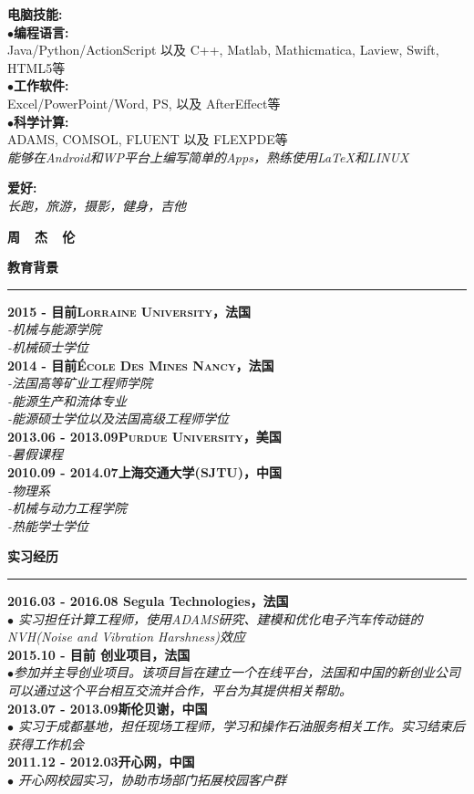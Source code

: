 \documentclass[a4paper,12pt,final]{memoir}
\newcommand{\myThemeColor}{RoyalBlue}
\newcommand{\SmallSep}{\vspace{0.9em}}
\newcommand{\CVSection}[1]
	{\Large\textbf{#1}\par
	\vspace{0.2cm}\normalsize\normalfont}
\newcommand{\CVItem}[1]
	{\textbf{\color{\myThemeColor} #1}}
\begin{document}
\begin{CJK*}{UTF8}{gbsn}
\begin{flushright}
	\CVItem{{\large 电脑技能:}}\\
	$\bullet$\textbf{编程语言:}\\ Java/Python/ActionScript 以及 C++, Matlab, Mathicmatica, Laview, Swift, HTML5等\\
	$\bullet$\textbf{工作软件:}\\ Excel/PowerPoint/Word, PS, 以及 AfterEffect等 \\
	$\bullet$\textbf{科学计算:}\\ ADAMS, COMSOL, FLUENT 以及 FLEXPDE等 \\
	\SmallSep
	\textit{能够在Android和WP平台上编写简单的Apps，熟练使用\LaTeX 和LINUX}
	
	\CVItem{{\large 爱好:}}\\
	\textit{长跑，旅游，摄影，健身，吉他}
	\SmallSep
\end{flushright}\normalsize
\framebreak


\Huge\bfseries {\color{\myThemeColor} 周~~杰~~伦}\\
\normalsize\normalfont

\CVSection{教育背景}
\hrule
\SmallSep
\CVItem{2015 - 目前\hfill\textsc{Lorraine University，法国}}\\
\textit{-机械与能源学院}\\
\textit{-机械硕士学位}
\\
\CVItem{2014 - 目前\hfill\textsc{\'{E}cole Des Mines Nancy，法国}}\\
\textit{-法国高等矿业工程师学院}\\
\textit{-能源生产和流体专业}\\
\textit{-能源硕士学位以及法国高级工程师学位}
\\
\CVItem{2013.06 - 2013.09\hfill\textsc{Purdue University，美国}}\\
\textit{-暑假课程}
\\
\CVItem{2010.09 - 2014.07\hfill\textsc{上海交通大学(SJTU)，中国}}\\
\textit{-物理系\\
-机械与动力工程学院}\\
\textit{-热能学士学位}

\CVSection{实习经历}
\hrule
\SmallSep
\CVItem{2016.03 - 2016.08 \hfill Segula Technologies，法国}\\
\textit{$\bullet$ 实习担任计算工程师，使用ADAMS研究、建模和优化电子汽车传动链的NVH(Noise and Vibration Harshness)效应}
\\
\CVItem{2015.10 - 目前 \hfill 创业项目，法国}\\
\textit{$\bullet$参加并主导创业项目。该项目旨在建立一个在线平台，法国和中国的新创业公司可以通过这个平台相互交流并合作，平台为其提供相关帮助。} 
\\
\CVItem{2013.07 - 2013.09\hfill 斯伦贝谢，中国}\\
\textit{$\bullet$ 实习于成都基地，担任现场工程师，学习和操作石油服务相关工作。实习结束后获得工作机会}
\\
\CVItem{2011.12 - 2012.03\hfill 开心网，中国}\\
\textit{$\bullet$ 开心网校园实习，协助市场部门拓展校园客户群}


\end{CJK*}
\end{document}
